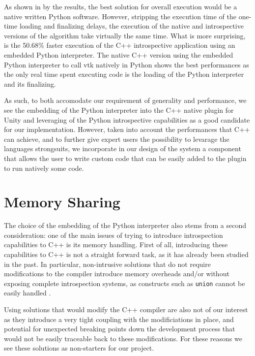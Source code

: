 As shown in by the results, the best solution for overall execution would be a native written Python software. However, stripping the execution time of the one-time loading and finalizing delays, the execution of the native and introspective versions of the algorithm take virtually the same time. What is more surprising, is the 50.68\% faster execution of the C++ introspective application using an embedded Python interpreter. The native C++ version using the embedded Python interpreter to call \acrshort{vtk} natively in Python shows the best performances as the only real time spent executing code is the loading of the Python interpreter and its finalizing.

As such, to both accomodate our requirement of generality and performance, we see the embedding of the Python interpreter into the C++ native plugin for Unity and leveraging of the Python introspective capabilities as a good candidate for our implementation. However, taken into account the performances that C++ can achieve, and to further give expert users the possibility to levarage the languages strongsuits, we incorporate in our design of the system a component that allows the user to write custom code that can be easily added to the plugin to run natively some code.

\section{Memory Sharing}

The choice of the embedding of the Python interpreter also stems from a second consideration: one of the main issues of trying to introduce introspection capabilities to C++ is its memory handling. First of all, introducing these capabilities to C++ is not a straight forward task, as it has already been studied in the past. In particular, non-intrusive solutions that do not require modifications to the compiler introduce memory overheads \cite{bayser2012rtti} and/or without exposing complete introspection systems, as constructs such as \verb|union| cannot be easily handled \cite{tyng1998nonintrusive}.

Using solutions that would modify the C++ compiler are also not of our interest as they introduce a very tight coupling with the modificiations in place, and potential for unexpected breaking points down the development process that would not be easily traceable back to these modifications. For these reasons we see these solutions as non-starters for our project.

